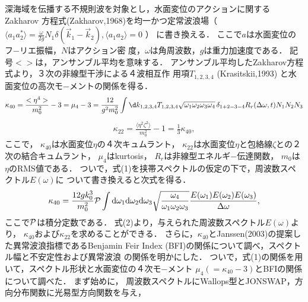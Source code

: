 \documentclass[11pt,dvipdfmx]{jarticle}
\begin{document}
深海域を伝播する不規則波を対象とし，水面変位のアクションに関するZakharov
方程式(Zakharov,1968)を均一かつ定常波浪場（
$
\langle a_1 a^*_2 \rangle = \frac{\omega}{2g} N_1 
\delta(\ensuremath{\vec{k}}_1-\vec{k}_2),
\langle a_1 a_2 \rangle =0
$
）
に書き換える．
ここで$a$は水面変位のフ−リエ振幅，$N$はアクション密
度，$\omega$は角周波数，$g$は重力加速度である．
記号$<>$は，アンサンブル平均を意味する．
アンサンブル平均したZakharov方程式より，３次の非線型干渉による４波相互作
用項$T_{1,2,3,4}$ (Krasitskii,1993) と水面変位の高次モ−メントの関係を得る．
\begin{eqnarray}
 \kappa_{40}
  = \frac{<\eta^4>}{m_0^2} - 3 
  = \mu_4 - 3
=
  \frac{12}{g^2m_0^2} 
  \int
  \d k_{1,2,3,4}
  T_{1,2,3,4}\sqrt{\omega_1\omega_2\omega_3\omega_4}
  \,\delta_{1+2-3-4}
  R_r(\Delta\omega,t)
  N_1 N_2 N_3
  \label{eqn:kurtosis-03}
\end{eqnarray}
\begin{eqnarray}
 \kappa_{22}=\frac{\langle \eta^2 \zeta^2 \rangle}{m_0^2}-1
  = \frac{1}{3} \kappa_{40},
  \label{p:14}
\end{eqnarray}
ここで，
$\kappa_{40}$は水面変位$\eta$の４次キュムラント，
$\kappa_{22}$は水面変位$\eta$と包絡線$\zeta$との２次の結合キュムラント，
$\mu_4$はkurtosis，
$R_r$は非線型エネルギ−伝達関数，
$m_0$は$\eta$のRMS値である．
ついで，式(1)を挟帯スペクトルの仮定の下で，周波数スペクトル$E(\omega)$に
ついて書き換えると次式を得る．
\begin{eqnarray}
 \kappa_{40}=\frac{12gk_0^3}{m_0^2}{\cal P}\int{\rm d}\omega_1{\rm d}\omega_2
{\rm d}\omega_3
\sqrt{\frac{\omega_4}{\omega_1\omega_2\omega_3}}
 \frac{ E(\omega_1) E(\omega_2) E(\omega_3)}
 {\Delta \omega},
\label{eqn:12}
\end{eqnarray}
ここで${\cal P}$は積分定数である．
式(2)より，与えられた周波数スペクトル$E(\omega)$より，
$\kappa_{40}$および$\kappa_{22}$を求めることができる．
さらに，$\kappa_{40}$とJanssen(2003)の提案した異常波浪指標であるBenjamin
Feir Index (BFI)の関係について調べ，スペクトル幅と不安定性および異常波浪
の関係を明かにした．
ついで，式(1)の関係を用いて，スペクトル形状と水面変位の４次モ−メント
$\mu_4(=\kappa_{40}-3)$とBFIの関係について調べた．
まず始めに，
周波数スペクトルにWallops型とJONSWAP，方向分布関数に光易型方向関数を与え，
\end{document}
